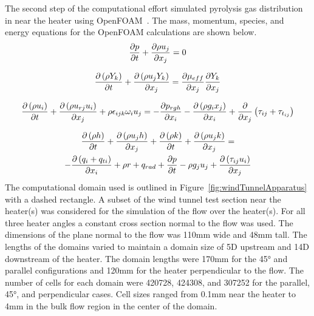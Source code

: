    The second step of the computational effort simulated pyrolysis gas distribution in near the heater using OpenFOAM~\cite{Foundation2020}. The mass, momentum, species, and energy equations for the OpenFOAM calculations are shown below.
            \begin{equation}
                \pder[p]{t} + \pder [\rho u_{j}] {x_{j}} = 0
            \end{equation}
            
            \begin{equation}
                \pder[\left( \rho Y_{k} \right)]{t}  + \pder[\left( \rho u_{j} Y_{k}\right)]{x_{j}}  = 
                \pder[\mu_{eff}]{x_{j}}  \pder[Y_{k}]{x_{j}} 
            \end{equation}
            
            \begin{equation}
                \pder[\left(\rho u_{i}\right)]{t}  + \pder[\left( \rho u_{rj}u_{i}\right)]{x_{j}}  + \rho \epsilon_{ijk}\omega_{i}u_{j}= - 
                \pder[p_{rgh}]{x_{i}}  - \pder[\left( \rho g_i x_j \right)] {x_i}  + \pder{x_j} \left( \tau_{ij} + \tau_{t_{ij}} \right)
            \end{equation}
            
            \begin{multline}
                \pder[\left(\rho h \right)]{t} + \pder[\left( \rho u_j h \right)]{x_j} + \pder[\left(  \rho k \right)]{t} + \pder[\left( \rho u_j k\right)]{x_j} = \\ -
                \pder[\left( q_i + q_{ti} \right)]{x_i} + \rho r + q_{rad} + \pder[p]{t} - \rho g_j u_j + \pder[\left( \tau_{ij} u_i \right)]{x_j}
            \end{multline}
      The computational domain used is outlined in Figure~\ref{fig:windTunnelApparatus} with a dashed rectangle. A subset of the wind tunnel test section near the heater(s) was considered for the simulation of the flow over the heater(s). For all three heater angles a constant cross section normal to the flow was used. The dimensions of the plane normal to the flow was 110\si{\milli\meter} wide and 48\si{\milli\meter} tall. The lengths of the domains varied to maintain a domain size of 5D upstream and 14D downstream of the heater. The domain lengths were 170\si{\milli\meter} for the 45\si{\degree} and parallel configurations and 120\si{\milli\meter} for the heater perpendicular to the flow. The number of cells for each domain were 420728, 424308, and 307252 for the parallel, 45\si{\degree}, and perpendicular cases. Cell sizes ranged from 0.1\si{\milli\meter} near the heater to 4\si{\milli\meter} in the bulk flow region in the center of the domain. 
      
